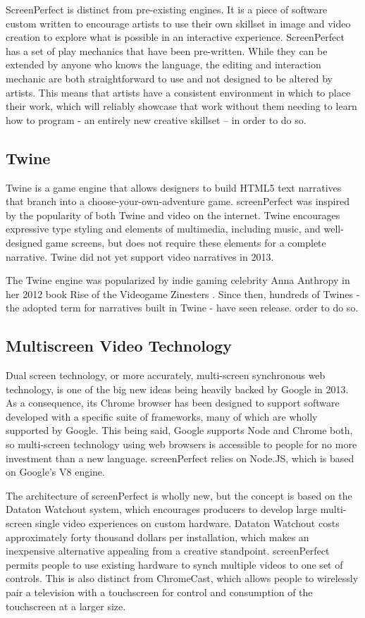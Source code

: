 ScreenPerfect is distinct from pre-existing engines. It is a piece of software custom written to encourage artists to use their own skillset in image and video creation to explore what is possible in an interactive experience. ScreenPerfect has a set of play mechanics that have been pre-written. While they can be extended by anyone who knows the language, the editing and interaction mechanic are both straightforward to use and not designed to be altered by artists. This means that artists have a consistent environment in which to place their work, which will reliably showcase that work without them needing to learn how to program - an entirely new creative skillset – in order to do so.

\subsection{Twine}
Twine is a game engine that allows designers to build HTML5 text narratives that branch into a choose-your-own-adventure game. screenPerfect was inspired by the popularity of both Twine and video on the internet. Twine encourages expressive type styling and elements of multimedia, including music, and well-designed game screens, but does not require these elements for a complete narrative. Twine did not yet support video narratives in 2013.

The Twine engine was popularized by indie gaming celebrity Anna Anthropy in her 2012 book Rise of the Videogame Zinesters \parencite{anthropy}. Since then, hundreds of Twines - the adopted term for narratives built in Twine - have seen release. 
order to do so.

\subsection{Multiscreen Video Technology}
Dual screen technology, or more accurately, multi-screen synchronous web technology, is one of the big new ideas being heavily backed by Google in 2013. As a consequence, its Chrome browser has been designed to support software developed with a specific suite of frameworks, many of which are wholly supported by Google. 
This being said, Google supports Node and Chrome both, so multi-screen technology using web browsers is accessible to people for no more investment than a new language. screenPerfect relies on Node.JS, which is based on Google's V8 engine.

The architecture of screenPerfect is wholly new, but the concept is based on the Dataton Watchout system, which encourages producers to develop large multi-screen single video experiences on custom hardware. Dataton Watchout costs approximately forty thousand dollars per installation, which makes an inexpensive alternative appealing from a creative standpoint. screenPerfect permits people to use existing hardware to synch multiple videos to one set of controls. This is also distinct from ChromeCast, which allows people to wirelessly pair a television with a touchscreen for control and consumption of the touchscreen at a larger size.

